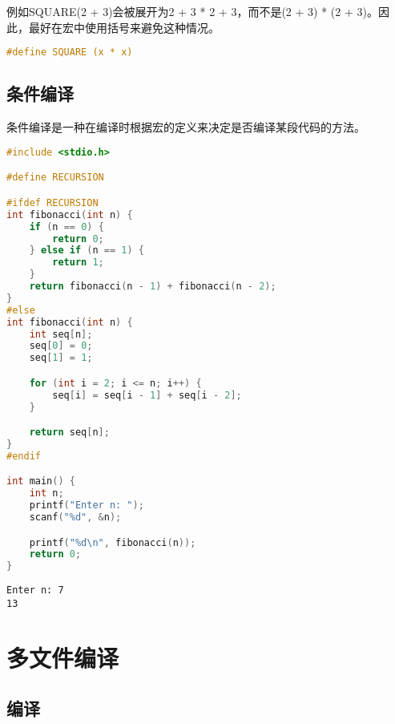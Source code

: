 例如SQUARE(2 + 3)会被展开为2 + 3 * 2 + 3，而不是(2 + 3) * (2 + 3)。因此，最好在宏中使用括号来避免这种情况。

\vspace{-0.5cm}

\begin{lstlisting}[language=C]
#define SQUARE (x * x)
\end{lstlisting}

\vspace{0.5cm}

\subsection{条件编译}

条件编译是一种在编译时根据宏的定义来决定是否编译某段代码的方法。\\


\begin{lstlisting}[language=C]
#include <stdio.h>

#define RECURSION

#ifdef RECURSION
int fibonacci(int n) {
    if (n == 0) {
        return 0;
    } else if (n == 1) {
        return 1;
    }
    return fibonacci(n - 1) + fibonacci(n - 2);
}
#else
int fibonacci(int n) {
    int seq[n];
    seq[0] = 0;
    seq[1] = 1;

    for (int i = 2; i <= n; i++) {
        seq[i] = seq[i - 1] + seq[i - 2];
    }

    return seq[n];
}
#endif

int main() {
    int n;
    printf("Enter n: ");
    scanf("%d", &n);

    printf("%d\n", fibonacci(n));
    return 0;
}
\end{lstlisting}

\begin{tcolorbox}
    \begin{verbatim}
Enter n: 7
13
	\end{verbatim}
\end{tcolorbox}

\newpage

\section{多文件编译}

\subsection{编译}

